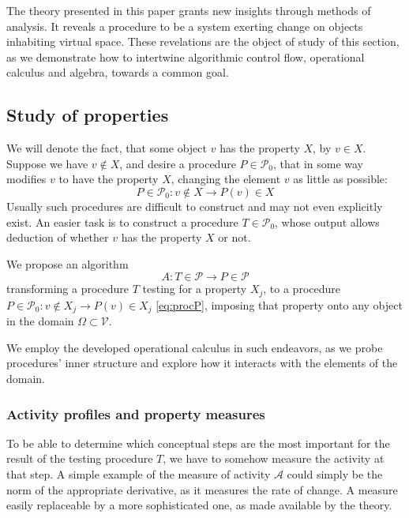 \documentclass{article}
\newcommand{\VV}{\mathcal{V}}
\newcommand{\dP}{\mathcal{P}}
\begin{document}
   The theory presented in this paper grants new insights through methods of analysis. It reveals a procedure to be a system exerting change on objects inhabiting virtual space. These revelations are the object of study of this section, as we demonstrate how to intertwine algorithmic control flow, operational calculus and algebra, towards a common goal.  
  
  \subsection{Study of properties}
  
  We will denote the fact, that some object $v$ has the property $X$, by $v\in
  X$. Suppose we have $v\notin X$, and desire a procedure $P\in\dP_0$, that in
  some way modifies $v$ to have the property $X$, changing the element $v$ as
  little as possible: 
  \begin{equation}\label{eq:procP}
  P\in \dP_0:v\notin X\to P(v)\in X
  \end{equation}
  Usually such procedures are difficult to construct and may not even explicitly
  exist. An easier task is to construct a procedure $T\in\dP_0$, whose output
  allows deduction of whether $v$ has the property $X$ or not. 
  
   We propose an algorithm
   \begin{equation}\label{eq:algA}
     A:T\in\dP\to P\in\dP
     \end{equation}
     transforming a procedure $T$ testing for a property $X_j$, to a procedure
     $P\in \dP_0:v\notin X_j\to P(v)\in X_j$ \eqref{eq:procP}, imposing that
     property onto any object in the domain $\Omega\subset \VV$.
   
   We employ the developed operational calculus in such endeavors, as we probe
   procedures' inner structure and explore how it interacts with the elements of
   the domain.
 
\subsubsection{Activity profiles and property measures}
    
To be able to determine which conceptual steps are the most important for the
result of the testing procedure $T$, we have to somehow measure the activity
at that step. A simple example of the measure of activity $\mathcal{A}$ could simply be the norm of the
appropriate derivative, as it measures the rate of change. A measure easily replaceable by a more sophisticated one, as made available by the theory.
\end{document}
